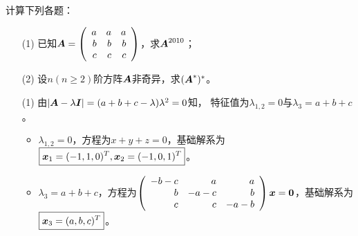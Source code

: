 \begin{frame}

\begin{li}[2009-2010第一学期]
计算下列各题：
\begin{itemize}
\item[(1)] 已知$\boldsymbol{A}=\left(
\begin{array}{rrr}
a&a&a\\
b&b&b\\
c&c&c
\end{array}
\right)$，求$\boldsymbol{A}^{2010}$；
\item[(2)] 设$n(n\ge2)$阶方阵$\boldsymbol{A}$非奇异，求$(\boldsymbol{A}^*)^*$。
\end{itemize}
\end{li}
\pause

\begin{jie}
\begin{itemize}
\item[(1)]由$|\boldsymbol{A}-\lambda\boldsymbol{I}|
=(a+b+c-\lambda)\lambda^2=0$知，
特征值为$\lambda_{1,2}=0$与$\lambda_3=a+b+c$。
\begin{itemize}
\item
$\lambda_{1,2}=0$，方程为$x+y+z=0$，基础解系为$\boxed{{\boldsymbol{x}}_1=(-1,1,0)^T,{\boldsymbol{x}}_2=(-1,0,1)^T}$。\\[0.1in]
\item
$\lambda_3=a+b+c$，方程为$\left(
\begin{array}{rrr}
-b-c&a&a\\
b&-a-c&b\\
c&c&-a-b
\end{array}
\right)\vx=\M0$，基础解系为$\boxed{{\boldsymbol{x}}_3=(a,b,c)^T}$。
\end{itemize}
\end{itemize}
\end{jie}
\end{frame}

